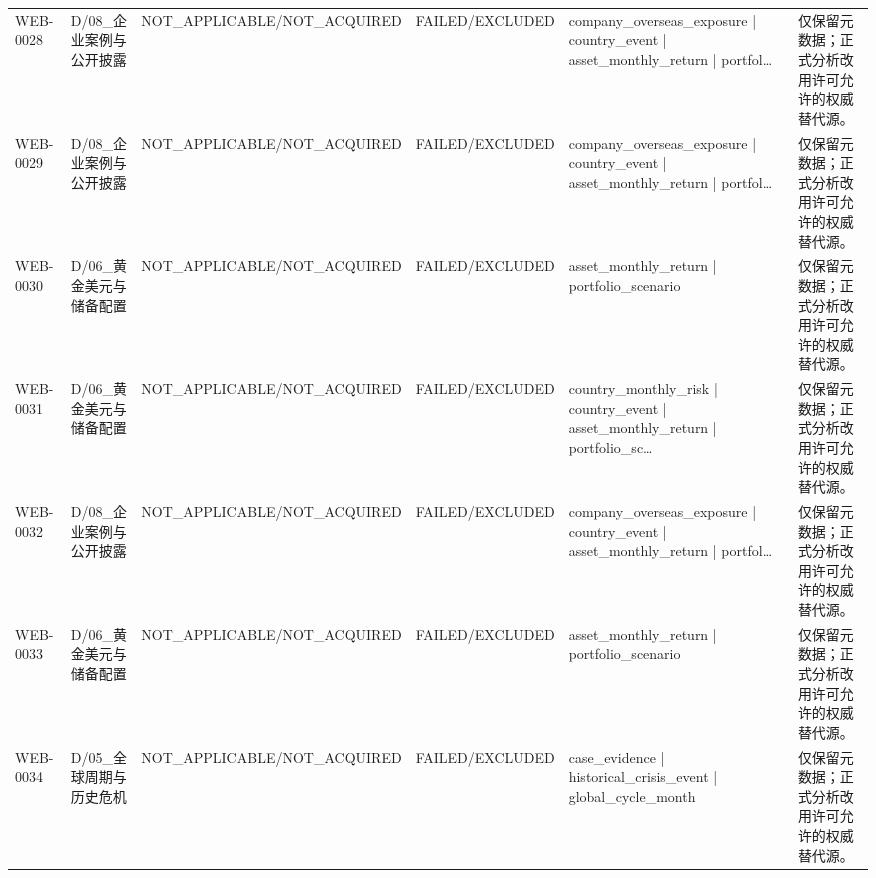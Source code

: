 \begin{landscape}
\begin{longtable}{p{1.8cm}p{2.6cm}p{2.6cm}p{2.6cm}p{4.8cm}p{7.2cm}}
WEB-0028 & D/\allowbreak{}08\_\allowbreak{}企业案例与公开披露 & NOT\_\allowbreak{}APPLICABLE/\allowbreak{}NOT\_\allowbreak{}ACQUIRED & FAILED/\allowbreak{}EXCLUDED & company\_\allowbreak{}overseas\_\allowbreak{}exposure | country\_\allowbreak{}event | asset\_\allowbreak{}monthly\_\allowbreak{}return | portfol… & 仅保留元数据；正式分析改用许可允许的权威替代源。\\
WEB-0029 & D/\allowbreak{}08\_\allowbreak{}企业案例与公开披露 & NOT\_\allowbreak{}APPLICABLE/\allowbreak{}NOT\_\allowbreak{}ACQUIRED & FAILED/\allowbreak{}EXCLUDED & company\_\allowbreak{}overseas\_\allowbreak{}exposure | country\_\allowbreak{}event | asset\_\allowbreak{}monthly\_\allowbreak{}return | portfol… & 仅保留元数据；正式分析改用许可允许的权威替代源。\\
WEB-0030 & D/\allowbreak{}06\_\allowbreak{}黄金美元与储备配置 & NOT\_\allowbreak{}APPLICABLE/\allowbreak{}NOT\_\allowbreak{}ACQUIRED & FAILED/\allowbreak{}EXCLUDED & asset\_\allowbreak{}monthly\_\allowbreak{}return | portfolio\_\allowbreak{}scenario & 仅保留元数据；正式分析改用许可允许的权威替代源。\\
WEB-0031 & D/\allowbreak{}06\_\allowbreak{}黄金美元与储备配置 & NOT\_\allowbreak{}APPLICABLE/\allowbreak{}NOT\_\allowbreak{}ACQUIRED & FAILED/\allowbreak{}EXCLUDED & country\_\allowbreak{}monthly\_\allowbreak{}risk | country\_\allowbreak{}event | asset\_\allowbreak{}monthly\_\allowbreak{}return | portfolio\_\allowbreak{}sc… & 仅保留元数据；正式分析改用许可允许的权威替代源。\\
WEB-0032 & D/\allowbreak{}08\_\allowbreak{}企业案例与公开披露 & NOT\_\allowbreak{}APPLICABLE/\allowbreak{}NOT\_\allowbreak{}ACQUIRED & FAILED/\allowbreak{}EXCLUDED & company\_\allowbreak{}overseas\_\allowbreak{}exposure | country\_\allowbreak{}event | asset\_\allowbreak{}monthly\_\allowbreak{}return | portfol… & 仅保留元数据；正式分析改用许可允许的权威替代源。\\
WEB-0033 & D/\allowbreak{}06\_\allowbreak{}黄金美元与储备配置 & NOT\_\allowbreak{}APPLICABLE/\allowbreak{}NOT\_\allowbreak{}ACQUIRED & FAILED/\allowbreak{}EXCLUDED & asset\_\allowbreak{}monthly\_\allowbreak{}return | portfolio\_\allowbreak{}scenario & 仅保留元数据；正式分析改用许可允许的权威替代源。\\
WEB-0034 & D/\allowbreak{}05\_\allowbreak{}全球周期与历史危机 & NOT\_\allowbreak{}APPLICABLE/\allowbreak{}NOT\_\allowbreak{}ACQUIRED & FAILED/\allowbreak{}EXCLUDED & case\_\allowbreak{}evidence | historical\_\allowbreak{}crisis\_\allowbreak{}event | global\_\allowbreak{}cycle\_\allowbreak{}month & 仅保留元数据；正式分析改用许可允许的权威替代源。\\

\end{longtable}
\end{landscape}
